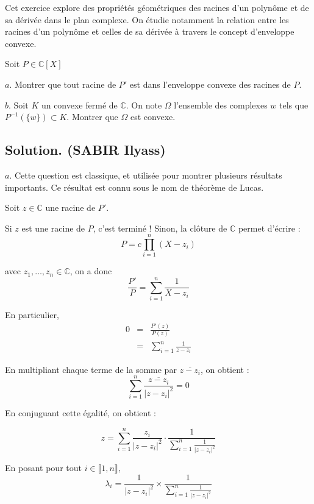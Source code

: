 Cet exercice explore des propri{\'e}t{\'e}s g{\'e}om{\'e}triques des racines
d'un polyn{\^o}me et de sa d{\'e}riv{\'e}e dans le plan complexe. On
{\'e}tudie notamment la relation entre les racines d'un polyn{\^o}me et celles
de sa d{\'e}riv{\'e}e {\`a} travers le concept d'enveloppe convexe.

\begin{exercise}[(Oral l'X 2007)]
Soit $P \in \mathbb{C}[X]$

$a.$ Montrer que tout racine de $P'$ est dans l'enveloppe convexe des racines
de $P$.

$b.$ Soit $K$ un convexe ferm{\'e} de $\mathbb{C}$. On note $\Omega$
l'ensemble des complexes $w$ tels que $P^{- 1} (\{w\}) \subset K$. Montrer que
$\Omega$ est convexe.
\end{exercise}

\subsection*{Solution. (SABIR Ilyass)}

$a.$ Cette question est classique, et utilis{\'e}e pour montrer plusieurs
r{\'e}sultats importants. Ce r{\'e}sultat est connu sous le nom de
th{\'e}or{\`e}me de Lucas.

Soit $z \in \mathbb{C}$ une racine de $P'$.

Si $z$ est une racine de $P$, c'est termin{\'e} ! Sinon, la cl{\^o}ture de
$\mathbb{C}$ permet d'{\'e}crire :
\[ P = c \prod_{i = 1}^n (X - z_i) \]


avec $z_1, \ldots, z_n \in \mathbb{C}$, on a donc
\[ \frac{P'}{P} = \sum_{i = 1}^n \frac{1}{X - z_i} \]


En particulier,
\begin{eqnarray*}
  0 & = & \frac{P' (z)}{P (z)}\\
  & = & \sum_{i = 1}^n \frac{1}{z - z_i}
\end{eqnarray*}


En multipliant chaque terme de la somme par $\overline{z - z_i}$, on obtient :
\[ \sum_{i = 1}^n \frac{\overline{z - z_i}}{|z - z_i |^2} = 0 \]


En conjuguant cette {\'e}galit{\'e}, on obtient :


\[ z = \sum_{i = 1}^n \frac{z_i}{|z - z_i |^2} \cdot \frac{1}{\sum_{i = 1}^n
   \frac{1}{|z - z_i |^2}} \]


En posant pour tout $i \in \llbracket 1, n \rrbracket,$
\[ \lambda_i = \frac{1}{|z - z_i |^2} \times \frac{1}{\sum_{i = 1}^n
   \frac{1}{|z - z_i |^2}} \]


